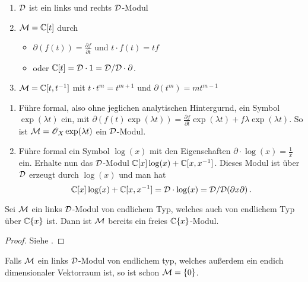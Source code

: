 \begin{exmp}
\cite[Exmp 2.2]{ArkhipovDmod}
\begin{enumerate}
\item $\mathcal{D}$ ist ein links und rechts $\mathcal{D}$-Modul
\item $\mathcal{M}=\mathbb{C}[t]$ durch
\begin{itemize}
\item $\partial(f(t))=\frac{\partial f}{\partial t}$ und
$t\cdot f(t)=tf$
\item oder \cite[Exmp 3.1.2]{ginzburg} $\mathbb{C}[t]=\mathcal{D}\cdot1=\mathcal{D}/\mathcal{D}\cdot\partial$.
\end{itemize}
\item $\mathcal{M}=\mathbb{C}[t,t^{-1}]$ mit $t\cdot t^{m}=t^{m+1}$ und
$\partial(t^m)=mt^{m-1}$
\end{enumerate}
\end{exmp}
\begin{exmp} 
\begin{enumerate}
\item \cite[Exmp 2.2]{ArkhipovDmod}
Führe formal, also ohne jeglichen analytischen Hintergurnd, ein Symbol
$\exp(\lambda t)$ ein, mit $\partial(f(t)\exp(\lambda t))=\frac{\partial
f}{\partial t}\exp(\lambda t)+f\lambda\exp(\lambda t)$.  So ist
$\mathcal{M}=\mathscr{O}_X\exp(\lambda t)$ ein $\mathcal{D}$-Modul.
\item \cite[Exmp 3.1.4]{ginzburg}
Führe formal ein Symbol $\log(x)$ mit den Eigenschaften
$\partial\cdot\log(x)=\frac{1}{x}$ ein. Erhalte nun das $\mathcal{D}$-Modul
$\mathbb{C}[x]\log(x)+\mathbb{C}[x,x^{-1}]$. Dieses Modul ist über $\mathcal{D}$ erzeugt durch
$\log(x)$ und man hat
\[
\mathbb{C}[x]\log(x)+\mathbb{C}[x,x^{-1}]=\mathcal{D}\cdot\log(x)=\mathcal{D}\slash\mathcal{D}(\partial x\partial) \,.
\]
\end{enumerate}
\end{exmp}

\begin{lem}\cite[Lem 2.3.3.]{sabbah_cimpa90}
Sei $\mathcal{M}$ ein links $\mathcal{D}$-Modul von endlichem Typ, welches auch von endlichem
Typ über ${\mathbb C \{x\}}$ ist. Dann ist $\mathcal{M}$ bereits ein freies $\mathbb{C}\{x\}$-Modul.
\end{lem}
\begin{proof}
Siehe \cite[Lem 2.3.3.]{sabbah_cimpa90}.
\end{proof}
\begin{cor} \cite[Cor 2.3.4.]{sabbah_cimpa90}
Falls $\mathcal{M}$ ein links $\mathcal{D}$-Modul von endlichem typ, welches außerdem ein
endich dimensionaler Vektorraum ist, so ist schon $\mathcal{M}=\{0\}$.
\end{cor}

